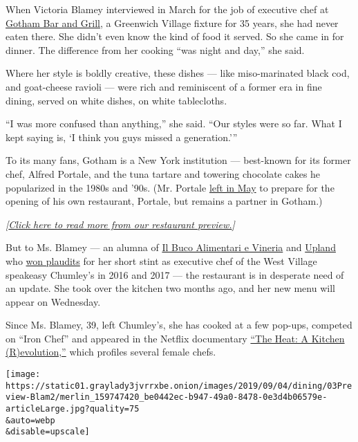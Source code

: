 When Victoria Blamey interviewed in March for the job of executive chef
at \href{https://www.gothambarandgrill.com/}{Gotham Bar and Grill}, a
Greenwich Village fixture for 35 years, she had never eaten there. She
didn't even know the kind of food it served. So she came in for dinner.
The difference from her cooking ``was night and day,'' she said.

Where her style is boldly creative, these dishes --- like miso-marinated
black cod, and goat-cheese ravioli --- were rich and reminiscent of a
former era in fine dining, served on white dishes, on white tablecloths.

``I was more confused than anything,'' she said. ``Our styles were so
far. What I kept saying is, `I think you guys missed a generation.'''

To its many fans, Gotham is a New York institution --- best-known for
its former chef, Alfred Portale, and the tuna tartare and towering
chocolate cakes he popularized in the 1980s and '90s. (Mr. Portale
\href{https://www.nytimes3xbfgragh.onion/2019/07/23/dining/gotham-bar-and-grill-chef-victoria-blamey.html}{left
in May} to prepare for the opening of his own restaurant, Portale, but
remains a partner in Gotham.)

\emph{{[}}\href{https://www.nytimes3xbfgragh.onion/2019/09/03/dining/fall-restaurant-preview-nyc.html}{\emph{Click
here to read more from our restaurant preview.}}\emph{{]}}

But to Ms. Blamey --- an alumna of
\href{https://www.nytimes3xbfgragh.onion/2012/02/15/dining/reviews/il-buco-alimentari-e-vineria-nyc-restaurant-review.html}{Il
Buco Alimentari e Vineria} and
\href{https://www.nytimes3xbfgragh.onion/2015/01/14/dining/restaurant-review-upland-on-park-avenue-south.html}{Upland}
who
\href{https://www.nytimes3xbfgragh.onion/2017/01/31/dining/chumleys-review-bar-west-village.html}{won
plaudits} for her short stint as executive chef of the West Village
speakeasy Chumley's in 2016 and 2017 --- the restaurant is in desperate
need of an update. She took over the kitchen two months ago, and her new
menu will appear on Wednesday.

Since Ms. Blamey, 39, left Chumley's, she has cooked at a few pop-ups,
competed on ``Iron Chef'' and appeared in the Netflix documentary
\href{http://redqueenproductions.com/index.php/portfolio/the-heat/}{``The
Heat: A Kitchen (R)evolution,''} which profiles several female chefs.

\texttt{[image: https://static01.graylady3jvrrxbe.onion/images/2019/09/04/dining/03Preview-Blam2/merlin\_159747420\_be0442ec-b947-49a0-8478-0e3d4b06579e-articleLarge.jpg?quality=75\\\&auto=webp\\\&disable=upscale]}

